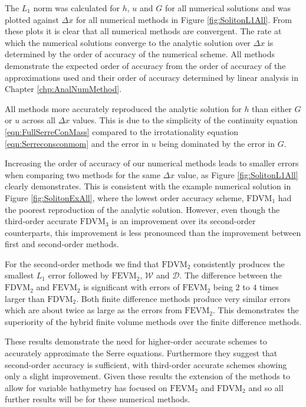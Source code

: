 The $L_1$ norm was calculated for $h$, $u$ and $G$ for all numerical solutions and was plotted against $\Delta x$ for all numerical methods in Figure \ref{fig:SolitonL1All}. From these plots it is clear that all numerical methods are convergent. The rate at which the numerical solutions converge to the analytic solution over $\Delta x$ is determined by the order of accuracy of the numerical scheme. All methods demonstrate the expected order of accuracy from the order of accuracy of the approximations used and their order of accuracy determined by linear analysis in Chapter \ref{chp:AnalNumMethod}.  

All methods more accurately reproduced the analytic solution for $h$ than either $G$ or $u$ across all $\Delta x$ values. This is due to the simplicity of the continuity equation \eqref{eqn:FullSerreConMass} compared to the irrotationality equation \eqref{eqn:Serreconsconmom} and the error in $u$ being dominated by the error in $G$. 

Increasing the order of accuracy of our numerical methods leads to smaller errors when comparing two methods for the same $\Delta x$ value, as Figure \ref{fig:SolitonL1All} clearly demonstrates. This is consistent with the example numerical solution in Figure \ref{fig:SolitonExAll}, where the lowest order accuracy scheme, $\text{FDVM}_1$ had the poorest reproduction of the analytic solution. However, even though the third-order accurate $\text{FDVM}_3$ is an improvement over its second-order counterparts, this improvement is less pronounced than the improvement between first and second-order methods.

For the second-order methods we find that $\text{FDVM}_2$ consistently produces the smallest $L_1$ error followed by $\text{FEVM}_2$, $\mathcal{W}$ and $\mathcal{D}$. The difference between the $\text{FDVM}_2$ and $\text{FEVM}_2$ is significant with errors of $\text{FEVM}_2$ being $2$ to $4$ times larger than $\text{FDVM}_2$. Both finite difference methods produce very similar errors which are about twice as large as the errors from $\text{FEVM}_2$. This demonstrates the superiority of the hybrid finite volume methods over the finite difference methods. 

These results demonstrate the need for higher-order accurate schemes to accurately approximate the Serre equations. Furthermore they suggest that second-order accuracy is sufficient, with third-order accurate schemes showing only a slight improvement. Given these results the extension of the methods to allow for variable bathymetry has focused on $\text{FEVM}_2$ and $\text{FDVM}_2$ and so all further results will be for these numerical methods. 

